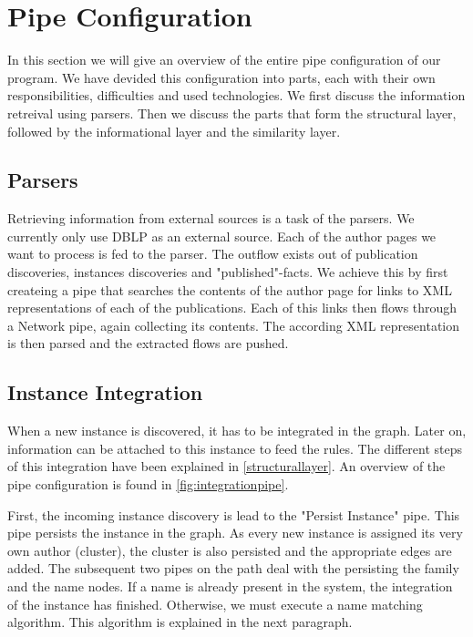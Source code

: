 \section{Pipe Configuration}

In this section we will give an overview of the entire pipe configuration of our program. We have devided this configuration into parts, each with their own responsibilities, difficulties and used technologies. We first discuss the information retreival using parsers. Then we discuss the parts that form the structural layer, followed by the informational layer and the similarity layer.

\subsection{Parsers}

Retrieving information from external sources is a task of the parsers. We currently only use DBLP as an external source. Each of the author pages we want to process is fed to the parser. The outflow exists out of publication discoveries, instances discoveries and "published"-facts. We achieve this by first createing a pipe that searches the contents of the author page for links to XML representations of each of the publications. Each of this links then flows through a Network pipe, again collecting its contents. The according XML representation is then parsed and the extracted flows are pushed.

\subsection{Instance Integration}

When a new instance is discovered, it has to be integrated in the graph. Later on, information can be attached to this instance to feed the rules. The different steps of this integration have been explained in \autoref{structurallayer}. An overview of the pipe configuration is found in \autoref{fig:integrationpipe}.

First, the incoming instance discovery is lead to the "Persist Instance" pipe. This pipe persists the instance in the graph. As every new instance is assigned its very own author (cluster), the cluster is also persisted and the appropriate edges are added. The subsequent two pipes on the path deal with the persisting the family and the name nodes. If a name is already present in the system, the integration of the instance has finished. Otherwise, we must execute a name matching algorithm. This algorithm is explained in the next paragraph.

